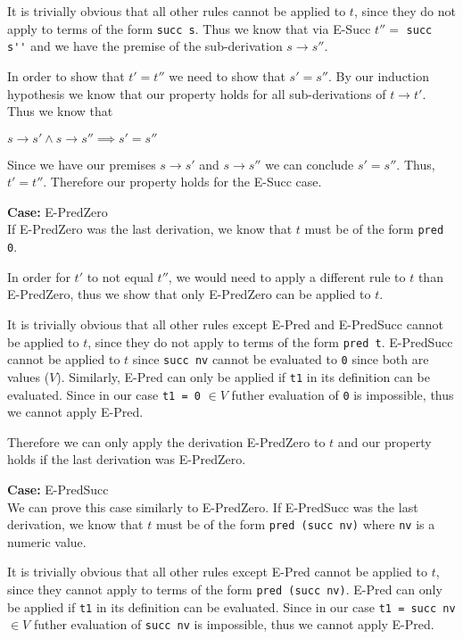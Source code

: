 \documentclass[12pt, fleqn]{article}
\begin{document}
It is trivially obvious that all other rules cannot be applied to $t$, since they do not apply to terms of the form \verb|succ s|.
Thus we know that via E-Succ $t'' =$ \verb|succ s''| and we have the premise of the sub-derivation $s \rightarrow s''$.

In order to show that $t' = t''$ we need to show that $s' = s''$. By our induction hypothesis we know that our property holds for
all sub-derivations of $t \rightarrow t'$. Thus we know that
\begin{center}
    $s \rightarrow s' \land s \rightarrow s'' \implies s' = s''$
\end{center}
Since we have our premises $s \rightarrow s'$ and $s \rightarrow s''$ we can conclude  $s' = s''$. Thus, $t' = t''$. Therefore our
property holds for the E-Succ case.

\medskip
\textbf{Case:} E-PredZero\\
If E-PredZero was the last derivation, we know that $t$ must be of the form \verb|pred 0|.

In order for $t'$ to not equal $t''$, we would need to apply a different rule to $t$ than E-PredZero, thus
we show that only E-PredZero can be applied to $t$.

\medskip
It is trivially obvious that all other rules except E-Pred and E-PredSucc cannot be applied to $t$, since they do not apply to
terms of the form \verb|pred t|. 
E-PredSucc cannot be applied to $t$ since \verb|succ nv| cannot be evaluated to \verb|0| since both are values ($V$).
Similarly, E-Pred can only be applied if \verb|t1| in its definition can be evaluated. 
Since in our case \verb|t1 = 0| $\in V$ futher evaluation of \verb|0| is impossible, thus we cannot apply E-Pred.

\medskip
Therefore we can only apply the derivation E-PredZero to $t$ and our property holds if the last derivation was E-PredZero.

\medskip
\textbf{Case:} E-PredSucc\\
We can prove this case similarly to E-PredZero. If E-PredSucc was the last derivation, we know that $t$ must
be of the form \verb|pred (succ nv)| where \verb|nv| is a numeric value.

\medskip
It is trivially obvious that all other rules except E-Pred cannot be applied to $t$, since they cannot apply to
terms of the form \verb|pred (succ nv)|. E-Pred can only be applied if \verb|t1| in its definition can be evaluated. 
Since in our case \verb|t1 = succ nv| $\in V$ futher evaluation of \verb|succ nv| is impossible, thus we cannot apply E-Pred.
\end{document}
